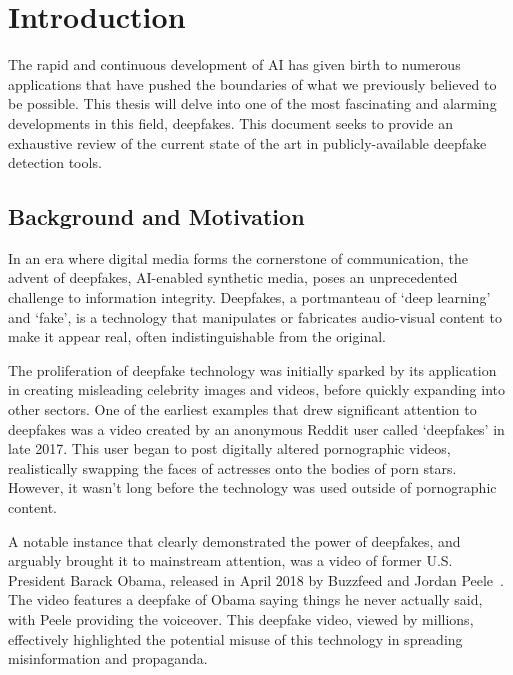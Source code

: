 
\chapter{Introduction}\label{chapter:introduction}
The rapid and continuous development of \ac{AI} has given birth to numerous
applications that have pushed the boundaries of what we previously believed to be possible.
This thesis will delve into one of the most fascinating and alarming developments in this
field, deepfakes. This document seeks to provide an exhaustive review of the current state
of the art in publicly-available deepfake detection tools.



\section{Background and Motivation}\label{background:backgroundAndMotivation}
In an era where digital media forms the cornerstone of communication, the advent of deepfakes,
\ac{AI}-enabled synthetic media, poses an unprecedented challenge to information integrity.
Deepfakes, a portmanteau of `deep learning' and `fake', is a technology that manipulates or
fabricates audio-visual content to make it appear real, often indistinguishable from the original.

The proliferation of deepfake technology was initially sparked by its application in creating
misleading celebrity images and videos, before quickly expanding into other sectors. One of the
earliest examples that drew significant attention to deepfakes was a video created by an anonymous
Reddit user called `deepfakes' in late 2017. This user began to post digitally altered pornographic
videos, realistically swapping the faces of actresses onto the bodies of porn stars. However, it
wasn't long before the technology was used outside of pornographic content.

A notable instance that clearly demonstrated the power of deepfakes, and arguably brought it to
mainstream attention, was a video of former U.S. President Barack Obama, released in April 2018
by Buzzfeed and Jordan Peele~\cite{peele,10.1145/3371409}. The video features a deepfake of Obama 
saying things he never actually said, with Peele providing the voiceover. This deepfake video, 
viewed by millions, effectively highlighted the potential misuse of this technology in spreading 
misinformation and propaganda.

